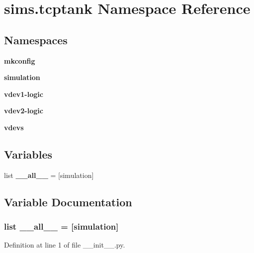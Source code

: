 \section{sims.\+tcptank Namespace Reference}
\label{namespacesims_1_1tcptank}
\subsection*{Namespaces}
\begin{DoxyCompactItemize}
\item 
 {\bf mkconfig}
\item 
 {\bf simulation}
\item 
 {\bf vdev1-\/logic}
\item 
 {\bf vdev2-\/logic}
\item 
 {\bf vdevs}
\end{DoxyCompactItemize}
\subsection*{Variables}
\begin{DoxyCompactItemize}
\item 
list {\bf \+\_\+\+\_\+all\+\_\+\+\_\+} = [\textquotesingle{}simulation\textquotesingle{}]
\end{DoxyCompactItemize}


\subsection{Variable Documentation}
\subsubsection[{\+\_\+\+\_\+all\+\_\+\+\_\+}]{\setlength{\rightskip}{0pt plus 5cm}list \+\_\+\+\_\+all\+\_\+\+\_\+ = [\textquotesingle{}simulation\textquotesingle{}]}\label{namespacesims_1_1tcptank_aa4a022e6ddacd362b83964da5cc5d044}


Definition at line 1 of file \+\_\+\+\_\+init\+\_\+\+\_\+.\+py.

